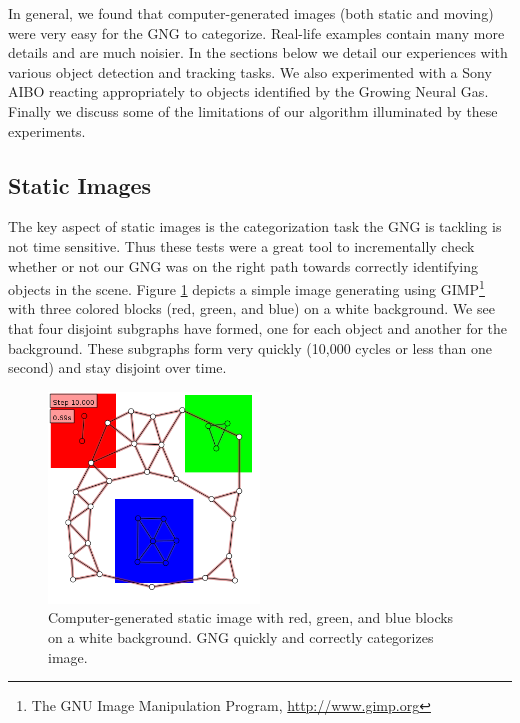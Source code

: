 \documentclass{article}
\renewcommand{\|}{\origbar} %
\begin{document}
In general, we found that computer-generated images (both static and moving) were very easy for the GNG to categorize. Real-life examples contain many more details and are much noisier. In the sections below we detail our experiences with various object detection and tracking tasks. We also experimented with a Sony AIBO reacting appropriately to objects identified by the Growing Neural Gas. Finally we discuss some of the limitations of our algorithm illuminated by these experiments.

\subsection{Static Images}


The key aspect of static images is the categorization task the GNG is tackling is not time sensitive. Thus these tests were a great tool to incrementally check whether or not our GNG was on the right path towards correctly identifying objects in the scene. Figure \ref{fig:rgbStatic} depicts a simple image generating using GIMP\footnote{The GNU Image Manipulation Program, \url{http://www.gimp.org}} with three colored blocks (red, green, and blue) on a white background. We see that four disjoint subgraphs have formed, one for each object and another for the background. These subgraphs form very quickly (10,000 cycles or less than one second) and stay disjoint over time. 

\begin{figure}[h!]
  \begin{center}
    \includegraphics[width=0.5\textwidth]{rgb_static.png}
  \end{center}
  \caption{Computer-generated static image with red, green, and blue blocks on a white background. GNG quickly and correctly categorizes image.}
  \label{fig:rgbStatic}
\end{figure}
\end{document}
